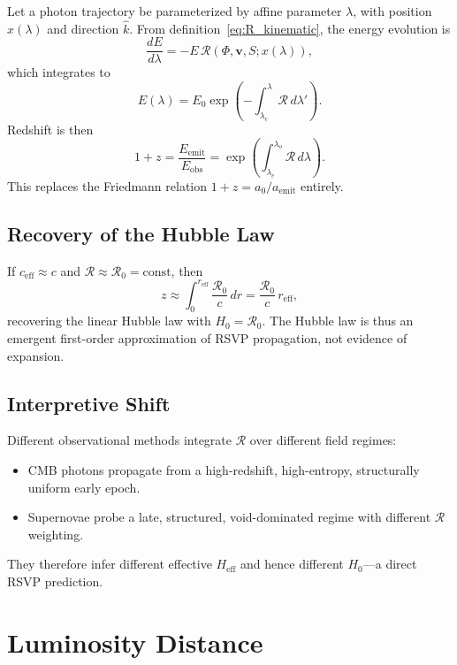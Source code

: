\documentclass[12pt,a4paper]{article}
\theoremstyle{remark}
\newcommand{\vv}{\mathbf{v}}
\newcommand{\Rcal}{\mathcal{R}}
\newcommand{\reff}{r_{\mathrm{eff}}}
\newcommand{\Heff}{H_{\mathrm{eff}}}
\newcommand{\ceff}{c_{\mathrm{eff}}}
\begin{document}
Let a photon trajectory be parameterized by affine parameter $\lambda$, with position $x(\lambda)$ and direction $\hat{k}$. From definition~\eqref{eq:R_kinematic}, the energy evolution is
\begin{equation}
\frac{dE}{d\lambda} = -E\,\Rcal(\Phi, \vv, S; x(\lambda)),
\end{equation}
which integrates to
\begin{equation}
E(\lambda) = E_0 \exp\!\left(-\int_{\lambda_e}^{\lambda}\Rcal\, d\lambda'\right).
\end{equation}
Redshift is then
\begin{equation}
1 + z = \frac{E_{\mathrm{emit}}}{E_{\mathrm{obs}}} = \exp\!\left(\int_{\lambda_e}^{\lambda_o}\Rcal\, d\lambda\right).
\end{equation}
This replaces the Friedmann relation $1+z = a_0/a_{\mathrm{emit}}$ entirely.

\subsection{Recovery of the Hubble Law}

If $\ceff \approx c$ and $\Rcal \approx \Rcal_0 = \mathrm{const}$, then
\begin{equation}
z \approx \int_0^{\reff} \frac{\Rcal_0}{c}\, dr = \frac{\Rcal_0}{c}\,\reff,
\end{equation}
recovering the linear Hubble law with $H_0 = \Rcal_0$. The Hubble law is thus an emergent first-order approximation of RSVP propagation, not evidence of expansion.

\subsection{Interpretive Shift}

Different observational methods integrate $\Rcal$ over different field regimes:
\begin{itemize}[leftmargin=2em]
\item CMB photons propagate from a high-redshift, high-entropy, structurally uniform early epoch.
\item Supernovae probe a late, structured, void-dominated regime with different $\Rcal$ weighting.
\end{itemize}
They therefore infer different effective $\Heff$ and hence different $H_0$---a direct RSVP prediction.

\section{Luminosity Distance}
\label{sec:luminosity}
\end{document}
